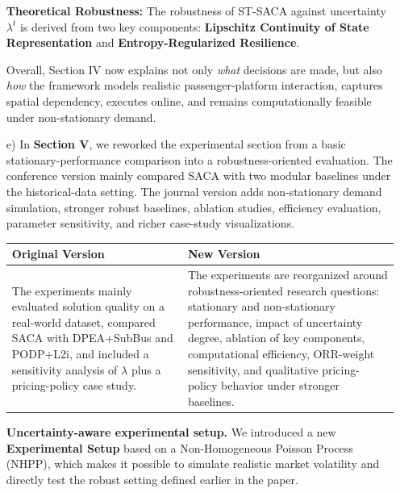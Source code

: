 \documentclass[11pt, a4paper]{article}
\begin{document}
\begin{itemize}
\begin{boxedminipage}[htbp]{\linewidth}
    \textbf{Theoretical Robustness:} The robustness of ST-SACA against uncertainty $\lambda^t$ is derived from two key components: \textbf{Lipschitz Continuity of State Representation} and \textbf{Entropy-Regularized Resilience}.
    \end{boxedminipage}

    Overall, Section IV now explains not only \textit{what} decisions are made, but also \textit{how} the framework models realistic passenger-platform interaction, captures spatial dependency, executes online, and remains computationally feasible under non-stationary demand.

    \item[e)] In \textbf{Section V}, we reworked the experimental section from a basic stationary-performance comparison into a robustness-oriented evaluation. The conference version mainly compared SACA with two modular baselines under the historical-data setting. The journal version adds non-stationary demand simulation, stronger robust baselines, ablation studies, efficiency evaluation, parameter sensitivity, and richer case-study visualizations.

    \begin{tabular}{|p{}|p{}|}
        \hline
        \textbf{Original Version} & \textbf{New Version}\\
        \hline
        The experiments mainly evaluated solution quality on a real-world dataset, compared SACA with DPEA+SubBus and PODP+L2i, and included a sensitivity analysis of $\lambda$ plus a pricing-policy case study. &
        The experiments are reorganized around robustness-oriented research questions: stationary and non-stationary performance, impact of uncertainty degree, ablation of key components, computational efficiency, ORR-weight sensitivity, and qualitative pricing-policy behavior under stronger baselines.\\
        \hline
    \end{tabular}

    \textbf{Uncertainty-aware experimental setup.} We introduced a new \textbf{Experimental Setup} based on a Non-Homogeneous Poisson Process (NHPP), which makes it possible to simulate realistic market volatility and directly test the robust setting defined earlier in the paper.
    

\end{itemize}
\end{document}
